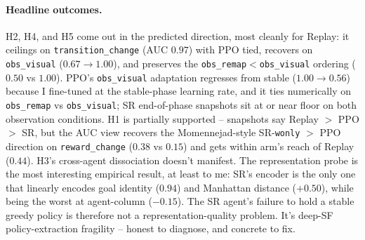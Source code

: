 \documentclass{article}
\begin{document}
\paragraph{Headline outcomes.} H2, H4, and H5 come out in the predicted direction, most cleanly for Replay: it ceilings on \texttt{transition\_change} (AUC $0.97$) with PPO tied, recovers on \texttt{obs\_visual} ($0.67{\rightarrow}1.00$), and preserves the \texttt{obs\_remap}${<}$\texttt{obs\_visual} ordering ($0.50$ vs $1.00$). PPO's \texttt{obs\_visual} adaptation regresses from stable ($1.00{\rightarrow}0.56$) because I fine-tuned at the stable-phase learning rate, and it ties numerically on \texttt{obs\_remap} vs \texttt{obs\_visual}; SR end-of-phase snapshots sit at or near floor on both observation conditions. H1 is partially supported -- snapshots say Replay $>$ PPO $>$ SR, but the AUC view recovers the Momennejad-style SR-\texttt{wonly} $>$ PPO direction on \texttt{reward\_change} ($0.38$ vs $0.15$) and gets within arm's reach of Replay ($0.44$). H3's cross-agent dissociation doesn't manifest. The representation probe is the most interesting empirical result, at least to me: SR's encoder is the only one that linearly encodes goal identity ($0.94$) and Manhattan distance ($+0.50$), while being the worst at agent-column ($-0.15$). The SR agent's failure to hold a stable greedy policy is therefore not a representation-quality problem. It's deep-SF policy-extraction fragility -- honest to diagnose, and concrete to fix.




\appendix

\end{document}
